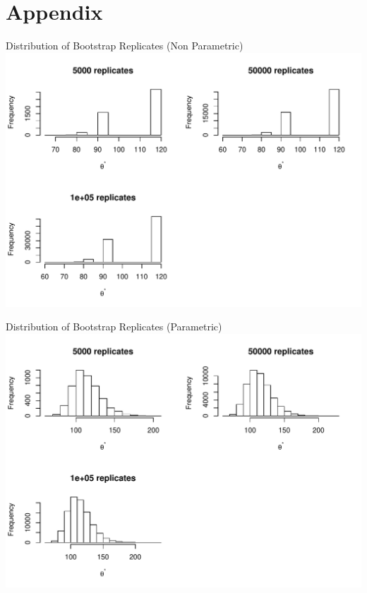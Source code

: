 \documentclass[a4paper,9pt]{beamer}\usepackage[]{graphicx}\usepackage[]{color}
\makeatletter
\def\maxwidth{ %
  \ifdim\Gin@nat@width>\linewidth
    \linewidth
  \else
    \Gin@nat@width
  \fi
}
\newenvironment{knitrout}{}{} %
\makeatother
\begin{document}
\section{Appendix}
\begin{frame}{Distribution of Bootstrap Replicates (Non Parametric)}
\begin{knitrout}
\color{fgcolor}
\includegraphics[width=\maxwidth]{figure/plots3-1} 

\end{knitrout}
\end{frame}

\begin{frame}{Distribution of Bootstrap Replicates (Parametric)}
\begin{knitrout}
\color{fgcolor}
\includegraphics[width=\maxwidth]{figure/plots32-1} 

\end{knitrout}
\end{frame}
\end{document}
